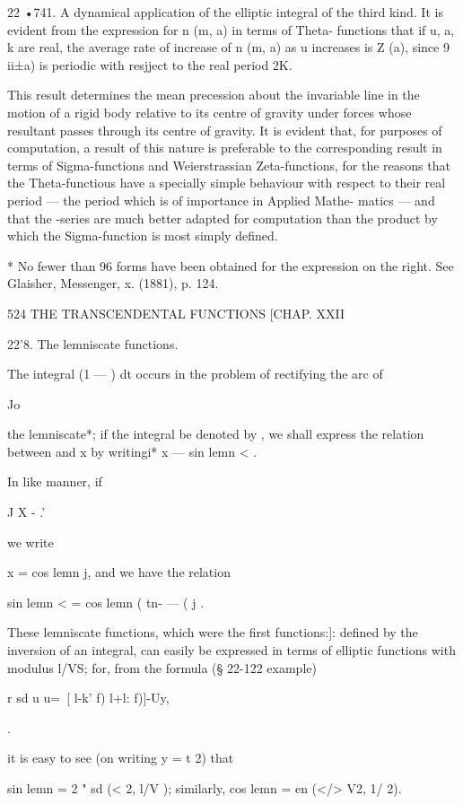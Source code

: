 22 •741. A dynamical application of the elliptic integral of the third
kind. It is evident from the expression for n (m, a) in terms of
Theta- functions that if u, a, k are real, the average rate of
increase of n (m, a) as u increases is Z (a), since 9 ii±a) is
periodic with resjject to the real period 2K.

This result determines the mean precession about the invariable line
in the motion of a rigid body relative to its centre of gravity under
forces whose resultant passes through its centre of gravity. It is
evident that, for purposes of computation, a result of this nature is
preferable to the corresponding result in terms of Sigma-functions and
Weierstrassian Zeta-functions, for the reasons that the
Theta-functious have a specially simple behaviour with respect to
their real period — the period which is of importance in Applied
Mathe- matics — and that the -series are much better adapted for
computation than the product by which the Sigma-function is most
simply defined.

* No fewer than 96 forms have been obtained for the expression on the
right. See Glaisher, Messenger, x. (1881), p. 124.

524 THE TRANSCENDENTAL FUNCTIONS [CHAP. XXII

22'8. The lemniscate functions.

The integral (1 — ) dt occurs in the problem of rectifying the arc of

Jo

the lemniscate*; if the integral be denoted by , we shall express the
relation between and x by writingi* x — sin lemn < .

In like manner, if

J X - .'

we write

x = cos lemn j, and we have the relation

sin lemn < = cos lemn ( tn- — ( j .

These lemniscate functions, which were the first functions:]: defined
by the inversion of an integral, can easily be expressed in terms of
elliptic functions with modulus l/VS; for, from the formula (§ 22-122
example)

r sd u u=\ [ l-k' f) l+l: f)]-Uy,

.

it is easy to see (on writing y = t \/2) that

sin lemn = 2 " sd (< \/2, l/V ); similarly, cos lemn = en (</> V2, 1/
2).

